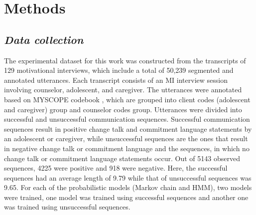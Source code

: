 \documentclass{amia_summit_2018}
\begin{document}
\section*{Methods}
\subsection*{\textit{Data collection}}
The experimental dataset for this work was constructed from the transcripts of 129 motivational interviews, which include a total of 50,239 segmented and annotated utterances. Each transcript consists of an MI interview session involving counselor, adolescent, and caregiver. The utterances were annotated based on MYSCOPE codebook \cite{carcone2013provider}, which are grouped into client codes (adolescent and caregiver) group and counselor codes group. Utterances were divided into successful and unsuccessful communication sequences. Successful communication sequences result in positive change talk and commitment language statements by an adolescent or caregiver, while unsuccessful sequences are the ones that result in negative change talk or commitment language and the sequences, in which no change talk or commitment language statements occur. Out of 5143 observed sequences, 4225 were positive and 918 were negative. Here, the successful sequences had an average length of 9.79 while that of unsuccessful sequences was 9.65. For each of the probabilistic models (Markov chain and HMM), two models were trained, one model was trained using successful sequences and another one was trained using unsuccessful sequences. 

%
\end{document}
